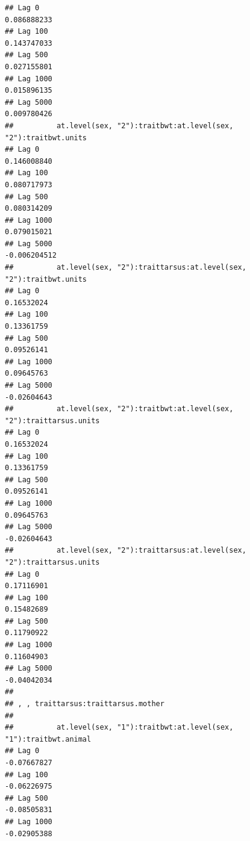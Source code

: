 \documentclass[
  12pt,
]{book}
\begin{document}
\begin{verbatim}
## Lag 0                                                            0.086888233
## Lag 100                                                          0.143747033
## Lag 500                                                          0.027155801
## Lag 1000                                                         0.015896135
## Lag 5000                                                         0.009780426
##          at.level(sex, "2"):traitbwt:at.level(sex, "2"):traitbwt.units
## Lag 0                                                      0.146008840
## Lag 100                                                    0.080717973
## Lag 500                                                    0.080314209
## Lag 1000                                                   0.079015021
## Lag 5000                                                  -0.006204512
##          at.level(sex, "2"):traittarsus:at.level(sex, "2"):traitbwt.units
## Lag 0                                                          0.16532024
## Lag 100                                                        0.13361759
## Lag 500                                                        0.09526141
## Lag 1000                                                       0.09645763
## Lag 5000                                                      -0.02604643
##          at.level(sex, "2"):traitbwt:at.level(sex, "2"):traittarsus.units
## Lag 0                                                          0.16532024
## Lag 100                                                        0.13361759
## Lag 500                                                        0.09526141
## Lag 1000                                                       0.09645763
## Lag 5000                                                      -0.02604643
##          at.level(sex, "2"):traittarsus:at.level(sex, "2"):traittarsus.units
## Lag 0                                                             0.17116901
## Lag 100                                                           0.15482689
## Lag 500                                                           0.11790922
## Lag 1000                                                          0.11604903
## Lag 5000                                                         -0.04042034
## 
## , , traittarsus:traittarsus.mother
## 
##          at.level(sex, "1"):traitbwt:at.level(sex, "1"):traitbwt.animal
## Lag 0                                                       -0.07667827
## Lag 100                                                     -0.06226975
## Lag 500                                                     -0.08505831
## Lag 1000                                                    -0.02905388

\end{verbatim}
\end{document}
